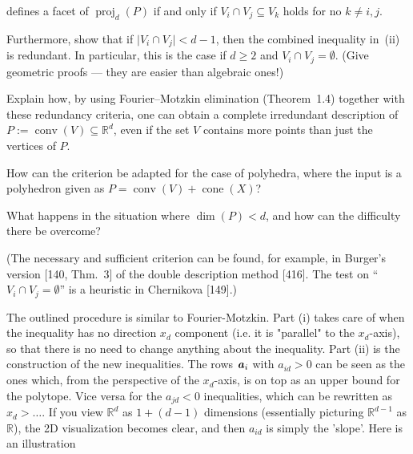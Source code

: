\documentclass{article}
\begin{document}
\begin{enumerate}
\begin{enumerate}[label=(\roman*)]
defines a facet of $\operatorname{proj}_d(P)$ if and only if $V_i \cap V_j \subseteq V_k$ holds for no $k \ne i,j$.
\end{enumerate}

Furthermore, show that if $\lvert V_i \cap V_j\rvert < d-1$, then the combined inequality in~(ii) is redundant. In particular, this is the case if $d \ge 2$ and $V_i \cap V_j = \emptyset$. (Give geometric proofs --- they are easier than algebraic ones!)

Explain how, by using Fourier--Motzkin elimination (Theorem~1.4) together with these redundancy criteria, one can obtain a complete irredundant description of $P := \operatorname{conv}(V) \subseteq \mathbb{R}^d$, even if the set $V$ contains more points than just the vertices of $P$.

How can the criterion be adapted for the case of polyhedra, where the input is a polyhedron given as $P = \operatorname{conv}(V) + \operatorname{cone}(X)$?

What happens in the situation where $\dim(P) < d$, and how can the difficulty there be overcome?

(The necessary and sufficient criterion can be found, for example, in Burger’s version [140, Thm.~3] of the double description method [416]. The test on “$V_i \cap V_j = \emptyset$” is a heuristic in Chernikova [149].)

\begin{solution}
    The outlined procedure is similar to Fourier-Motzkin. Part (i) takes care of when the inequality has no direction $x_d$ component (i.e. it is "parallel" to the $x_d$-axis), so that there is no need to change anything about the inequality. Part (ii) is the construction of the new inequalities. The rows $\textbf{\textit{a}}_i$ with $a_{id} > 0$ can be seen as the ones which, from the perspective of the $x_d$-axis, is on top as an upper bound for the polytope. Vice versa for the $a_{jd}<0$ inequalities, which can be rewritten as $x_d > \ldots$. If you view $\mathbb{R}^{d}$ as $1 + (d-1)$ dimensions (essentially picturing $\mathbb{R}^{d-1}$ as $\mathbb{R}$), the 2D visualization becomes clear, and then $a_{id}$ is simply the 'slope'. Here is an illustration

\begin{figure}[h]
    \centering
{}
\end{figure}
\end{solution}
\end{enumerate}
\end{document}
